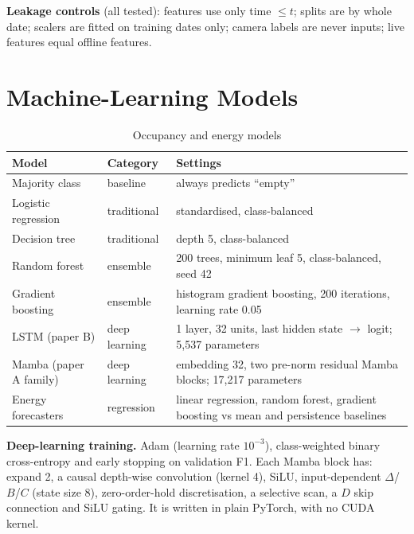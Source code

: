 \documentclass[12pt,a4paper,oneside]{report}
\newcommand{\ra}{$\rightarrow$}
\begin{document}
\textbf{Leakage controls} (all tested): features use only time $\leq t$; splits are by whole date; scalers are fitted
on training dates only; camera labels are never inputs; live features equal offline features.

\section{Machine-Learning Models}
\begin{table}[H]
\centering
\caption{Occupancy and energy models}
\label{tab:models}
\small
\begin{tabularx}{\textwidth}{@{}L{3.2cm}L{2.4cm}Y@{}}
\toprule
\textbf{Model} & \textbf{Category} & \textbf{Settings}\\
\midrule
Majority class & baseline & always predicts ``empty''\\
Logistic regression & traditional & standardised, class-balanced\\
Decision tree & traditional & depth 5, class-balanced\\
Random forest & ensemble & 200 trees, minimum leaf 5, class-balanced, seed 42\\
Gradient boosting & ensemble & histogram gradient boosting, 200 iterations, learning rate 0.05\\
LSTM (paper B) & deep learning & 1 layer, 32 units, last hidden state \ra{} logit; 5,537 parameters\\
Mamba (paper A family) & deep learning & embedding 32, two pre-norm residual Mamba blocks; 17,217 parameters\\
Energy forecasters & regression & linear regression, random forest, gradient boosting vs mean and persistence baselines\\
\bottomrule
\end{tabularx}
\end{table}

\textbf{Deep-learning training.} Adam (learning rate $10^{-3}$), class-weighted binary cross-entropy and early
stopping on validation F1. Each Mamba block has: expand 2, a causal depth-wise convolution (kernel 4), SiLU,
input-dependent $\Delta$/$B$/$C$ (state size 8), zero-order-hold discretisation, a selective scan, a $D$ skip
connection and SiLU gating. It is written in plain PyTorch, with no CUDA kernel.
\end{document}
